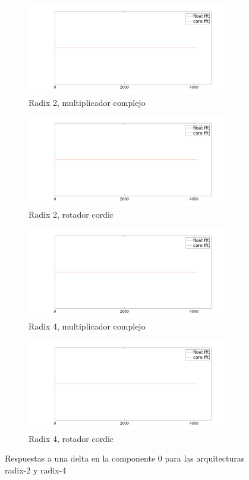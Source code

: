 \begin{figure}[htbp!]
        \advance\leftskip-1.5cm
        \begin{subfigure}{0.6\textwidth}
        \includegraphics[width=9cm]{./figures/r2_delta0_16_4096_mul.png}
        \caption{Radix 2, multiplicador complejo}
        \end{subfigure}%
        \begin{subfigure}{0.6\textwidth}%
        \includegraphics[width=9cm]{./figures/r2_delta0_16_4096_cor.png}
        \caption{Radix 2, rotador cordic}
        \end{subfigure} 
        \begin{subfigure}{0.6\textwidth}%
        \includegraphics[width=9cm]{./figures/r4_delta0_16_4096_mul.png}
        \caption{Radix 4, multiplicador complejo}
        \end{subfigure}%
        \begin{subfigure}{0.6\textwidth}%
        \includegraphics[width=9cm]{./figures/r4_delta0_16_4096_cor.png}
        \caption{Radix 4, rotador cordic}
        \end{subfigure}
        \caption{Respuestas a una delta en la componente $0$ para las arquitecturas radix-2 y
        radix-4}
        \label{fig:outDelta0}
\end{figure}

